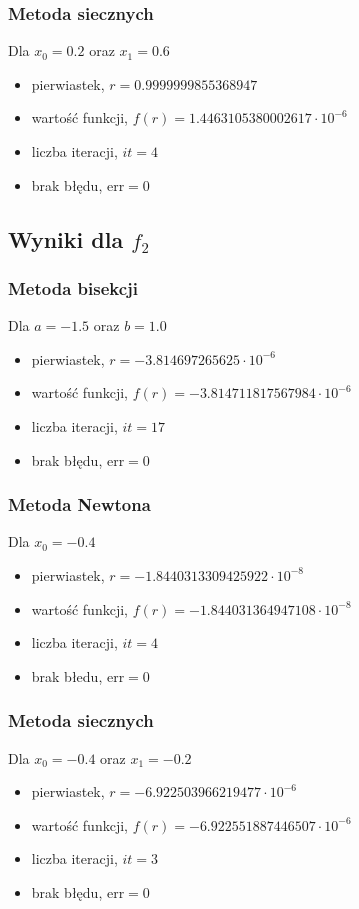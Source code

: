 \documentclass{article}
\begin{document}
\subsubsection*{Metoda siecznych}
	Dla $x_0 = 0.2$ oraz $x_1 = 0.6$
	\begin{itemize}
		\item pierwiastek, $r = 0.9999999855368947$
	    \item wartość funkcji, $f(r) = 1.4463105380002617 \cdot 10^{-6}$
	    \item liczba iteracji, $it = 4$
	    \item brak błędu, $\mathrm{err} = 0$
	\end{itemize}
\subsection*{Wyniki dla $f_2$}
\subsubsection*{Metoda bisekcji}
	Dla $a = -1.5$ oraz $b = 1.0$
	\begin{itemize}
		\item pierwiastek, $r = -3.814697265625 \cdot 10^{-6}$
	    \item wartość funkcji, $f(r) = -3.814711817567984 \cdot 10^{-6}$
	    \item liczba iteracji, $it = 17$
	    \item brak błędu, $\mathrm{err} = 0$
	\end{itemize}
\subsubsection*{Metoda Newtona}
	Dla $x_0 = -0.4$
	\begin{itemize}
		\item pierwiastek, $r = -1.8440313309425922 \cdot 10^{-8}$
	    \item wartość funkcji, $f(r) = -1.844031364947108 \cdot 10^{-8}$
	    \item liczba iteracji, $it = 4$
	    \item brak błedu, $\mathrm{err} = 0$
	\end{itemize}
\subsubsection*{Metoda siecznych}
	Dla $x_0 = -0.4$ oraz $x_1 = -0.2$
	\begin{itemize}
		\item pierwiastek, $r = -6.922503966219477 \cdot 10^{-6}$
	    \item wartość funkcji, $f(r) = -6.922551887446507 \cdot 10^{-6}$
	    \item liczba iteracji, $it = 3$
	    \item brak błędu, $\mathrm{err} = 0$
	\end{itemize}
\end{document}

